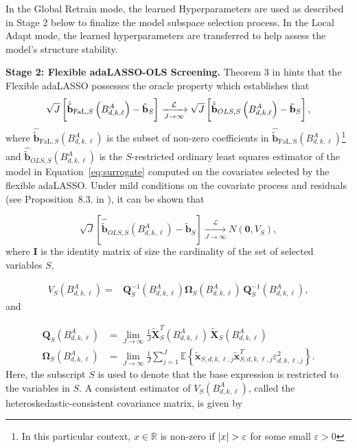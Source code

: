 \documentclass[10pt,a4paper,oneside]{article}
\newcommand{\R}{\mathbb{R}}
\newcommand{\E}{\mathbb{E}}
\DeclarePairedDelimiter{\aval}{\lvert}{\rvert} %
\begin{document}
In the Global Retrain mode, the learned Hyperparameters are used as described in Stage 2 below to finalize the model subspace selection process. In the Local Adapt mode, the learned hyperparameters are transferred to help assess the model's structure stability.
\medskip

\noindent\textbf{Stage 2: Flexible adaLASSO-OLS Screening.} Theorem 3 in \cite{MEDEIROS2016255} hints that the Flexible adaLASSO possesses the oracle property which establishes that
$$
    \sqrt{J} \left[\hat{\tilde{\mathbf{b}}}_{\mathrm{FaL},S} \left( B^A_{d, k, \ell} \right) - \tilde{\mathbf{b}}_S \right] \xrightarrow[J \rightarrow \infty]{\mathcal{L}}\\ \sqrt{J} \left[\hat{\tilde{\mathbf{b}}}_{OLS, S} \left( B^A_{d, k, \ell} \right) - \tilde{\mathbf{b}}_S\right],
$$
where $\hat{\tilde{\mathbf{b}}}_{\mathrm{FaL},S}\left( B^A_{d, k, \ell} \right)$ is the subset of non-zero coefficients in $\hat{\tilde{\mathbf{b}}}_{\mathrm{FaL,S}}\left( B^A_{d, k, \ell} \right)$\footnote{In this particular context, $x \in \R$ is non-zero if $\aval{x} > \varepsilon$ for some small $\varepsilon > 0$} and $\hat{\tilde{\mathbf{b}}}_{OLS, S}\left( B^A_{d, k, \ell} \right)$ is the $S$-restricted ordinary least squares estimator of the model in Equation~\eqref{eq:surrogate} computed on the covariates selected by the flexible adaLASSO. Under mild conditions on the covariate process and residuals (see Proposition~8.3. in \cite{hamilton_time_1994}), it can be shown that

$$
    \sqrt{J}\left[\hat{\tilde{\mathbf{b}}}_{OLS,S} \left( B^A_{d, k, \ell} \right) - \tilde{\mathbf{b}}_S \right]  \xrightarrow[J \rightarrow \infty]{\mathcal{L}} N(\mathbf{0}, V_S),
$$
where $\mathbf{I}$ is the identity matrix of size the cardinality of the set of selected variables $S$,

\begin{align*}
    V_{S} \left( B^A_{d, k, \ell} \right)
    ={} &
    \mathbf{Q}^{-1}_S\left(B^A_{d,k,\ell}\right)\mathbf{\Omega}_S\left(B^A_{d,k,\ell}\right) \, \mathbf{Q}^{-1}_S\left(B^A_{d,k,\ell}\right),
\end{align*}
and

\begin{align*}
    \mathbf{Q}_S\left(B^A_{d,k,\ell}\right)      & = \lim_{J \rightarrow \infty} \frac{1}{J}\tilde{\mathbf{X}}_{S}^T(B^A_{d,k,\ell})
    \,\tilde{\mathbf{X}}_{S}(B^A_{d,k,\ell})                                                                                                                                                                                          \\
    \mathbf{\Omega}_S\left(B^A_{d,k,\ell}\right) & = \lim_{J \rightarrow \infty} \frac{1}{J} \sum^J_{j = 1} \E \left \{ \tilde{\mathbf{x}}_{S,d,k,\ell,j} \tilde{\mathbf{x}}_{S,d,k,\ell,j}^T \varepsilon^2_{d, k, \ell, j} \right\}.
\end{align*}
Here, the subscript $S$ is used to denote that the base expression is restricted to the variables in $S$. A consistent estimator of $V_S\left( B^A_{d,k,\ell} \right)$, called the heteroskedastic-consistent covariance matrix, is given by
\end{document}
